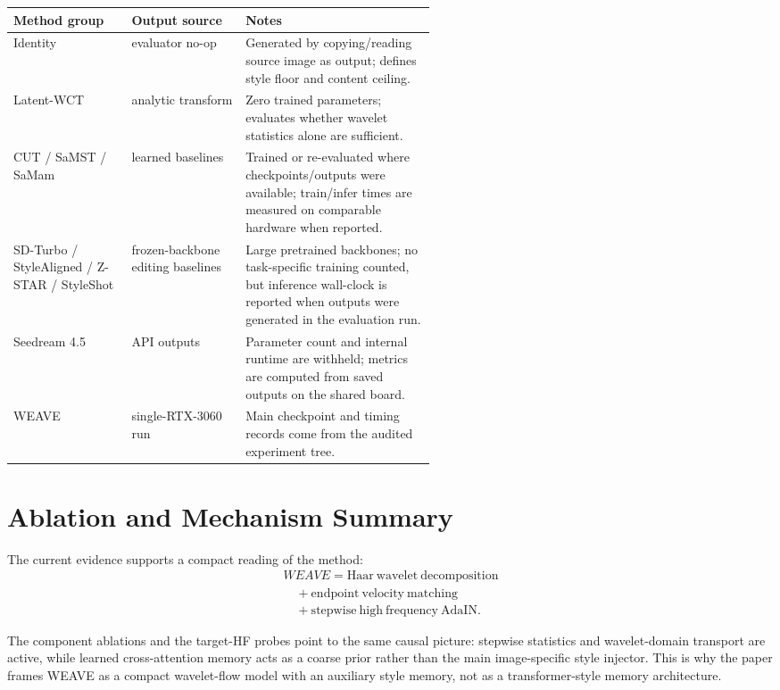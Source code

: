 \documentclass[10pt,twocolumn]{article}
\newcommand{\weave}{WEAVE}
\begin{document}
\begin{center}
\footnotesize
\begin{tabularx}{\linewidth}{p{0.28\linewidth}p{0.27\linewidth}X}
\toprule
Method group & Output source & Notes \\
\midrule
Identity & evaluator no-op & Generated by copying/reading source image as output; defines style floor and content ceiling. \\
Latent-WCT & analytic transform & Zero trained parameters; evaluates whether wavelet statistics alone are sufficient. \\
CUT / SaMST / SaMam & learned baselines & Trained or re-evaluated where checkpoints/outputs were available; train/infer times are measured on comparable hardware when reported. \\
SD-Turbo / StyleAligned / Z-STAR / StyleShot & frozen-backbone editing baselines & Large pretrained backbones; no task-specific training counted, but inference wall-clock is reported when outputs were generated in the evaluation run. \\
Seedream 4.5 & API outputs & Parameter count and internal runtime are withheld; metrics are computed from saved outputs on the shared board. \\
WEAVE & single-RTX-3060 run & Main checkpoint and timing records come from the audited experiment tree. \\
\bottomrule
\end{tabularx}
\normalsize
\end{center}

\section{Ablation and Mechanism Summary}

The current evidence supports a compact reading of the method:
\[
  \begin{array}{l}
  \weave{}=\mathrm{Haar\ wavelet\ decomposition}\\
  \quad+\mathrm{endpoint\ velocity\ matching}\\
  \quad+\mathrm{stepwise\ high\ frequency\ AdaIN}.
  \end{array}
\]

The component ablations and the target-HF probes point to the same causal picture:
stepwise statistics and wavelet-domain transport are active, while learned
cross-attention memory acts as a coarse prior rather than the main image-specific style
injector. This is why the paper frames \weave{} as a compact wavelet-flow model with an
auxiliary style memory, not as a transformer-style memory architecture.
\end{document}
